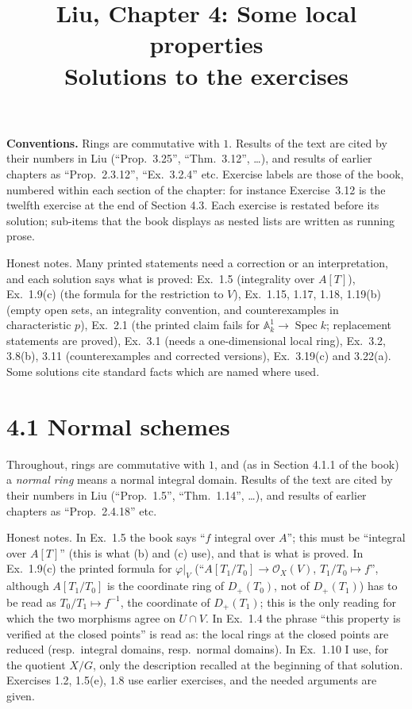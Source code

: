 \documentclass[11pt]{article}
\title{Liu, Chapter 4: Some local properties\\[2pt]\large Solutions to the exercises}
\author{}
\date{}
\begin{document}
\maketitle
\noindent\textbf{Conventions.} Rings are commutative with $1$. Results of the text are cited by their numbers in Liu (``Prop.~3.25'', ``Thm.~3.12'', \dots), and results of earlier chapters as ``Prop.~2.3.12'', ``Ex.~3.2.4'' etc. Exercise labels are those of the book, numbered within each section of the chapter: for instance Exercise~3.12 is the twelfth exercise at the end of Section 4.3. Each exercise is restated before its solution; sub-items that the book displays as nested lists are written as running prose.

Honest notes. Many printed statements need a correction or an interpretation, and each solution says what is proved: Ex.~1.5 (integrality over $A[T]$), Ex.~1.9(c) (the formula for the restriction to $V$), Ex.~1.15, 1.17, 1.18, 1.19(b) (empty open sets, an integrality convention, and counterexamples in characteristic $p$), Ex.~2.1 (the printed claim fails for $\mathbb A^1_k\to\operatorname{Spec}k$; replacement statements are proved), Ex.~3.1 (needs a one-dimensional local ring), Ex.~3.2, 3.8(b), 3.11 (counterexamples and corrected versions), Ex.~3.19(c) and 3.22(a). Some solutions cite standard facts which are named where used.

\section*{4.1 Normal schemes}

Throughout, rings are commutative with $1$, and (as in Section 4.1.1 of the book) a \emph{normal ring} means a normal integral domain. Results of the text are cited by their numbers in Liu (``Prop.~1.5'', ``Thm.~1.14'', \dots), and results of earlier chapters as ``Prop.~2.4.18'' etc.

Honest notes. In Ex.~1.5 the book says ``$f$ integral over $A$''; this must be ``integral over $A[T]$'' (this is what (b) and (c) use), and that is what is proved. In Ex.~1.9(c) the printed formula for $\varphi|_V$ (``$A[T_1/T_0]\to\mathcal O_X(V)$, $T_1/T_0\mapsto f$'', although $A[T_1/T_0]$ is the coordinate ring of $D_+(T_0)$, not of $D_+(T_1)$) has to be read as $T_0/T_1\mapsto f^{-1}$, the coordinate of $D_+(T_1)$; this is the only reading for which the two morphisms agree on $U\cap V$. In Ex.~1.4 the phrase ``this property is verified at the closed points'' is read as: the local rings at the closed points are reduced (resp.\ integral domains, resp.\ normal domains). In Ex.~1.10 I use, for the quotient $X/G$, only the description recalled at the beginning of that solution. Exercises 1.2, 1.5(e), 1.8 use earlier exercises, and the needed arguments are given.
\end{document}
